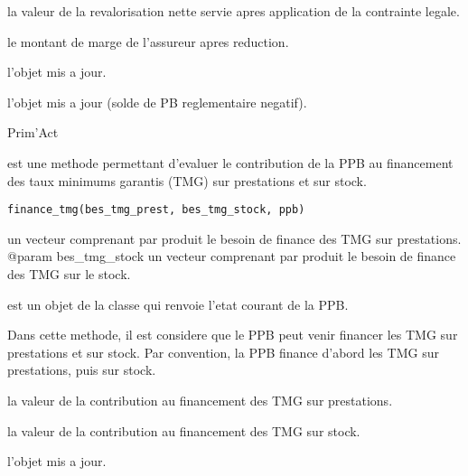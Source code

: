 \documentclass[a4paper]{book}
\begin{document}
%
\begin{Value}
 la valeur de la revalorisation nette servie apres application de la contrainte legale.

 le montant de marge de l'assureur apres reduction.

 l'objet  mis a jour.

 l'objet  mis a jour (solde de PB reglementaire negatif).
\end{Value}
%
\begin{Author}\relax
Prim'Act
\end{Author}
%
\begin{Description}\relax
{} est une methode permettant d'evaluer le contribution de la PPB
au financement des taux minimums garantis (TMG) sur prestations et sur stock.
\end{Description}
%
\begin{Usage}
\begin{verbatim}
finance_tmg(bes_tmg_prest, bes_tmg_stock, ppb)
\end{verbatim}
\end{Usage}
%
\begin{Arguments}
\begin{ldescription}
\item[\code{bes\_tmg\_prest}] un vecteur  comprenant
par produit le besoin de finance des TMG sur prestations.
@param bes\_tmg\_stock un vecteur  comprenant
par produit le besoin de finance des TMG sur le stock.

\item[\code{ppb}] est un objet de la classe  qui renvoie l'etat courant de la PPB.
\end{ldescription}
\end{Arguments}
%
\begin{Details}\relax
Dans cette methode, il est considere que le PPB peut venir financer les TMG sur prestations et sur stock.
Par convention, la PPB finance d'abord les TMG sur prestations, puis sur stock.
\end{Details}
%
\begin{Value}
 la valeur de la contribution au financement des TMG sur prestations.

 la valeur de la contribution au financement des TMG sur stock.

 l'objet  mis a jour.
\end{Value}
\end{document}

